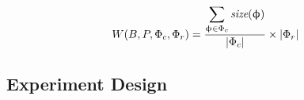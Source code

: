 \documentclass{sig-alternate}
\begin{document}
\begin{equation} \label{eq:space_calculate}
W(B,P, \Phi_c, \Phi_r) = \frac{\displaystyle \sum_{\upphi \in \Phi_c}
                   \mbox{{\em size}}(\upphi)}
         {|\Phi_c|} \times |\Phi_r|
\end{equation}







\vspace*{-.05in}
\subsection{Experiment Design}
\label{sec:design}
\end{document}
